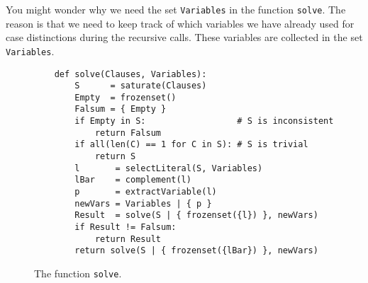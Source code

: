 You might wonder why we need the set \texttt{Variables} in the function \texttt{solve}. The reason is that we need to keep track of which variables we have already used for case distinctions during the recursive calls. These variables are collected in the set \texttt{Variables}.

\begin{figure}[!ht]
  \centering
\begin{verbatim}
    def solve(Clauses, Variables):
        S      = saturate(Clauses)
        Empty  = frozenset()
        Falsum = { Empty }
        if Empty in S:                  # S is inconsistent
            return Falsum           
        if all(len(C) == 1 for C in S): # S is trivial
            return S
        l       = selectLiteral(S, Variables)
        lBar    = complement(l)
        p       = extractVariable(l)
        newVars = Variables | { p }
        Result  = solve(S | { frozenset({l}) }, newVars)
        if Result != Falsum:
            return Result
        return solve(S | { frozenset({lBar}) }, newVars)
\end{verbatim}
\vspace*{-0.3cm}
  \caption{The function \texttt{solve}.}
  \label{fig:solve}
\end{figure} 
